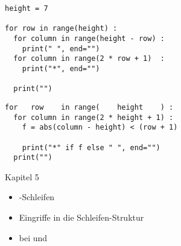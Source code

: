 \begin{frame}[fragile]
%
\begin{tcbraster}[raster columns=2,
                  raster equal height,
                  nobeforeafter,
                  raster column skip=0.5cm]
\begin{codebox}
\begin{verbatim}
height = 7

for row in range(height) :
  for column in range(height - row) :
    print(" ", end="")
  for column in range(2 * row + 1)  :
    print("*", end="")
  
  print("")
\end{verbatim}
\end{codebox}
%
\begin{codebox}
\begin{verbatim}
for   row    in range(    height    ) :
  for column in range(2 * height + 1) :
    f = abs(column - height) < (row + 1)
    
    print("*" if f else " ", end="")
  print("")
\end{verbatim}
\end{codebox}
\end{tcbraster}
%
\end{frame}


\begin{frame}[fragile]{Kapitel 5}
%
\begin{itemize}
\item {}-Schleifen
\item Eingriffe in die Schleifen-Struktur
\item {} bei  und 
\end{itemize}
%
\end{frame}


